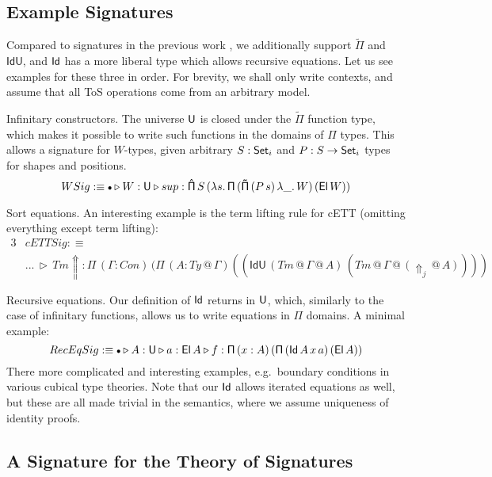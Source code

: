\documentclass{llncs}
\makeatletter
\newcommand{\Lift}{\Uparrow}
\newcommand{\ext}{\triangleright}
\newcommand{\emptycon}{\scaleobj{.75}\bullet}
\newcommand{\Pii}{\mathsf{\Pi}}
\newcommand{\Pie}{\mathsf{\hat{\Pi}}}
\newcommand{\Piinf}{\mathsf{\tilde{\Pi}}}
\newcommand{\appitt}{\mathop{{\scriptstyle @}}}
\newcommand{\IdU}{\mathsf{IdU}}
\makeatother
\begin{document}
\subsection{Example Signatures}

Compared to signatures in the previous work \cite{TODO}, we additionally support
$\Piinf$ and $\IdU$, and $\mathsf{Id}$ has a more liberal type which allows recursive
equations. Let us see examples for these three in order. For brevity, we shall
only write contexts, and assume that all ToS operations come from an arbitrary
model.

\begin{example}{Infinitary constructors}. The universe $\mathsf{U}$ is closed under
the $\Piinf$ function type, which makes it possible to write such functions
in the domains of $\Pii$ types. This allows a signature for $W$-types, given
arbitrary $S : \mathsf{Set}_i$ and $P : S \rightarrow \mathsf{Set}_i$ types for shapes and positions.
\[
WSig :\equiv
\emptycon \ext W : \U \ext sup : \Pie\,S\,(\lambda s.\,\Pii\,(\Piinf\,(P\,s)\,\lambda \_.\,W) \,(\El\,W))
\]
\end{example}

\begin{example}{Sort equations}. An interesting example is the term lifting
rule for cETT (omitting everything except term lifting):
\begin{alignat*}{3}
  & cETTSig :\equiv \\
  & ...\,\ext\,Tm{\Lift} : \Pii\,(\Gamma : Con)\,(\Pii\,(A : Ty{\appitt}\Gamma)((\IdU\,(Tm{\appitt}\Gamma{\appitt}A)\,(Tm{\appitt}\Gamma{\appitt}(\Lift_j{\appitt}A))))
\end{alignat*}
\end{example}

\begin{example}{Recursive equations}. Our definition of $\mathsf{Id}$ returns in $\mathsf{U}$,
which, similarly to the case of infinitary functions, allows us to write equations
in $\Pii$ domains. A minimal example:
\[
RecEqSig :\equiv \emptycon \ext A : \U \ext a : \El\,A \ext f : \Pii\,(x : A)\,(\Pii\,(\Id\,A\,x\,a)\,(\El\,A))
\]
There more complicated and interesting examples, e.g.\ boundary conditions in
various cubical type theories\cite{TODO}. Note that our $\mathsf{Id}$ allows iterated
equations as well, but these are all made trivial in the semantics, where we
assume uniqueness of identity proofs.
\end{example}

\subsection{A Signature for the Theory of Signatures}
\end{document}
